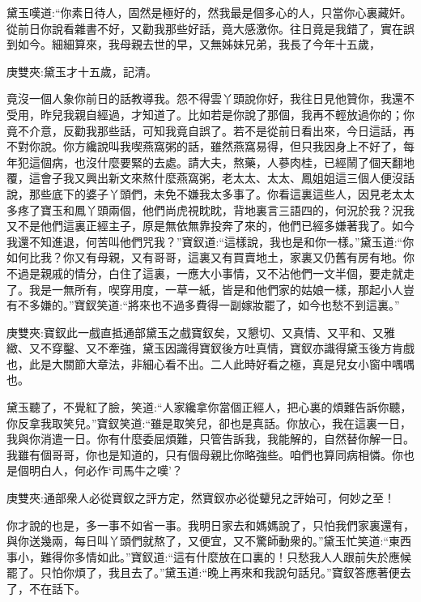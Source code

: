 \begin{parag}
    黛玉嘆道:“你素日待人，固然是極好的，然我最是個多心的人，只當你心裏藏奸。從前日你說看雜書不好，又勸我那些好話，竟大感激你。往日竟是我錯了，實在誤到如今。細細算來，我母親去世的早，又無姊妹兄弟，我長了今年十五歲，\begin{note}庚雙夾:黛玉才十五歲，記清。\end{note}竟沒一個人象你前日的話教導我。怨不得雲丫頭說你好，我往日見他贊你，我還不受用，昨兒我親自經過，才知道了。比如若是你說了那個，我再不輕放過你的；你竟不介意，反勸我那些話，可知我竟自誤了。若不是從前日看出來，今日這話，再不對你說。你方纔說叫我喫燕窩粥的話，雖然燕窩易得，但只我因身上不好了，每年犯這個病，也沒什麼要緊的去處。請大夫，熬藥，人蔘肉桂，已經鬧了個天翻地覆，這會子我又興出新文來熬什麼燕窩粥，老太太、太太、鳳姐姐這三個人便沒話說，那些底下的婆子丫頭們，未免不嫌我太多事了。你看這裏這些人，因見老太太多疼了寶玉和鳳丫頭兩個，他們尚虎視眈眈，背地裏言三語四的，何況於我？況我又不是他們這裏正經主子，原是無依無靠投奔了來的，他們已經多嫌著我了。如今我還不知進退，何苦叫他們咒我？”寶釵道:“這樣說，我也是和你一樣。”黛玉道:“你如何比我？你又有母親，又有哥哥，這裏又有買賣地土，家裏又仍舊有房有地。你不過是親戚的情分，白住了這裏，一應大小事情，又不沾他們一文半個，要走就走了。我是一無所有，喫穿用度，一草一紙，皆是和他們家的姑娘一樣，那起小人豈有不多嫌的。”寶釵笑道:“將來也不過多費得一副嫁妝罷了，如今也愁不到這裏。”\begin{note}庚雙夾:寶釵此一戲直抵通部黛玉之戲寶釵矣，又懇切、又真情、又平和、又雅緻、又不穿鑿、又不牽強，黛玉因識得寶釵後方吐真情，寶釵亦識得黛玉後方肯戲也，此是大關節大章法，非細心看不出。二人此時好看之極，真是兒女小窗中喁喁也。\end{note}黛玉聽了，不覺紅了臉，笑道:“人家纔拿你當個正經人，把心裏的煩難告訴你聽，你反拿我取笑兒。”寶釵笑道:“雖是取笑兒，卻也是真話。你放心，我在這裏一日，我與你消遣一日。你有什麼委屈煩難，只管告訴我，我能解的，自然替你解一日。我雖有個哥哥，你也是知道的，只有個母親比你略強些。咱們也算同病相憐。你也是個明白人，何必作‘司馬牛之嘆’？\begin{note}庚雙夾:通部衆人必從寶釵之評方定，然寶釵亦必從顰兒之評始可，何妙之至！\end{note}你才說的也是，多一事不如省一事。我明日家去和媽媽說了，只怕我們家裏還有，與你送幾兩，每日叫丫頭們就熬了，又便宜，又不驚師動衆的。”黛玉忙笑道:“東西事小，難得你多情如此。”寶釵道:“這有什麼放在口裏的！只愁我人人跟前失於應候罷了。只怕你煩了，我且去了。”黛玉道:“晚上再來和我說句話兒。”寶釵答應著便去了，不在話下。
\end{parag}


